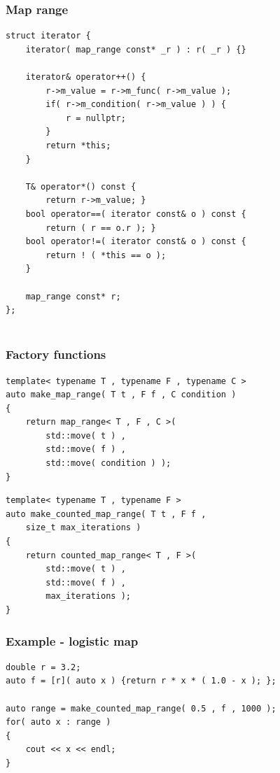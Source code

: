 \documentclass{beamer}
\newcommand{\heading}[1]{\frametitle{#1}}
\begin{document}
\begin{frame}[fragile]
  \heading{Map range}
  
\begin{lstlisting}[basicstyle=\scriptsize\ttfamily]
struct iterator {
    iterator( map_range const* _r ) : r( _r ) {}
    
    iterator& operator++() {
        r->m_value = r->m_func( r->m_value );
        if( r->m_condition( r->m_value ) ) {
            r = nullptr;
        }
        return *this;
    }
    
    T& operator*() const {
        return r->m_value; }
    bool operator==( iterator const& o ) const {
        return ( r == o.r ); }
    bool operator!=( iterator const& o ) const {
        return ! ( *this == o );
    }
    
    map_range const* r;
};
 
\end{lstlisting}

\end{frame}




\begin{frame}[fragile]
 \heading{Factory functions}
 
\begin{lstlisting}[basicstyle=\scriptsize\ttfamily]
template< typename T , typename F , typename C >
auto make_map_range( T t , F f , C condition )
{
    return map_range< T , F , C >(
        std::move( t ) ,
        std::move( f ) ,
        std::move( condition ) );
}
\end{lstlisting}

\begin{lstlisting}[basicstyle=\scriptsize\ttfamily]
template< typename T , typename F >
auto make_counted_map_range( T t , F f ,
    size_t max_iterations )
{
    return counted_map_range< T , F >(
        std::move( t ) ,
        std::move( f ) , 
        max_iterations );
}
\end{lstlisting}

\end{frame}


\begin{frame}[fragile]

  \heading{Example - logistic map}

\begin{lstlisting}[basicstyle=\scriptsize\ttfamily]
double r = 3.2;
auto f = [r]( auto x ) {return r * x * ( 1.0 - x ); };

auto range = make_counted_map_range( 0.5 , f , 1000 );
for( auto x : range )
{
    cout << x << endl;
}
\end{lstlisting}

\end{frame}
\end{document}
